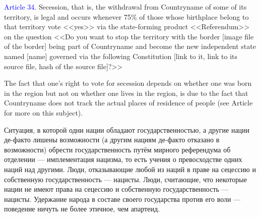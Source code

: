 \documentclass[11pt]{article}
\theoremstyle{remark}
\theoremstyle{definition}
\begin{document}
\textcolor{blue}{Article 34.} Secession, that is, the withdrawal from Countryname of some of its territory, is legal and occurs whenever 75\% of those whose birthplace belong to that territory vote <<yes>> via the state-forming product <<Referendum>> on the question <<Do you want to stop the territory with the border [image file of the border] being part of Countryname and become the new independent state named [name] governed via the following Constitution [link to it, link to its source file, hash of the source file]?>>





\color{blue}



The fact that one's right to vote for secession depends on whether one was born in the region but not on whether one lives in the region, is due to the fact that Countryname does not track the actual places of residence of people (see Article for more on this subject).



Ситуация, в которой одни нации обладают государственностью, а другие нации де-факто лишены возможности (а другим нациям де-факто отказано в возможности) обрести государственность путём мирного референдума об отделении --- имплементация нацизма, то есть учения о превосходстве одних наций над другими. Люди, отказывающие любой из наций в праве на сецессию и собственную государственность --- нацисты. Люди, считающие, что некоторые нации не имеют права на сецессию и собственную государственность --- нацисты. Удержание народа в составе своего государства против его воли --- поведение ничуть не более этичное, чем апартеид. 
\end{document}
